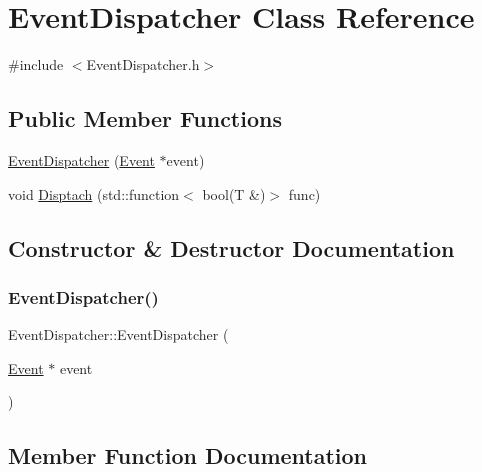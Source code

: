 \hypertarget{class_event_dispatcher}{}\section{Event\+Dispatcher Class Reference}
\label{class_event_dispatcher}


{\ttfamily \#include $<$Event\+Dispatcher.\+h$>$}

\subsection*{Public Member Functions}
\begin{DoxyCompactItemize}
\item 
\mbox{\hyperlink{class_event_dispatcher_a4230d150965d1bdf1552b60ea3f6a64a}{Event\+Dispatcher}} (\mbox{\hyperlink{class_event}{Event}} $\ast$event)
\item 
void \mbox{\hyperlink{class_event_dispatcher_a55e223be473ae7557648b85ea2b19f43}{Disptach}} (std\+::function$<$ bool(T \&)$>$ func)
\end{DoxyCompactItemize}


\subsection{Constructor \& Destructor Documentation}
\mbox{\label{class_event_dispatcher_a4230d150965d1bdf1552b60ea3f6a64a}} 
\subsubsection{\texorpdfstring{Event\+Dispatcher()}{EventDispatcher()}}
{\footnotesize\ttfamily Event\+Dispatcher\+::\+Event\+Dispatcher (\begin{DoxyParamCaption}\item[{\mbox{\hyperlink{class_event}{Event}} $\ast$}]{event }\end{DoxyParamCaption})\hspace{0.3cm}{\ttfamily [inline]}}



\subsection{Member Function Documentation}
\mbox{\label{class_event_dispatcher_a55e223be473ae7557648b85ea2b19f43}} 
